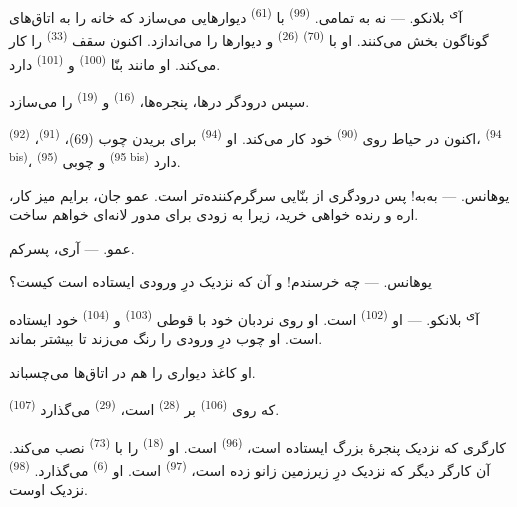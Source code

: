 آ\textsuperscript{ی} \textsc{بلانکو}. --- نه به تمامی. 
\textsuperscript{(99)} با  \textsuperscript{(61)}
دیوارهایی می‌سازد که خانه را به اتاق‌های گوناگون بخش می‌کنند. او با
 \textsuperscript{(70)} 
\textsuperscript{(26)} و دیوارها را می‌اندازد. اکنون سقف 
\textsuperscript{(33)} را کار می‌کند. او مانند بنّا 
\textsuperscript{(100)} و  \textsuperscript{(101)} دارد.

سپس درودگر درها، پنجره‌ها،  \textsuperscript{(16)} و
 \textsuperscript{(19)} را می‌سازد.

اکنون در حیاط روی  \textsuperscript{(90)} خود کار
می‌کند. او  \textsuperscript{(94)} برای بریدن چوب (69)،
 \textsuperscript{(91)}، 
\textsuperscript{(92)}،  \textsuperscript{(94 bis)}،
 \textsuperscript{(95)} و  چوبی
\textsuperscript{(95 bis)} دارد.

\textsc{یوهانس}. --- به‌به! پس درودگری از بنّایی سرگرم‌کننده‌تر است.
عمو جان، برایم میز کار، اره و رنده خواهی خرید، زیرا به زودی برای مدور
لانه‌ای خواهم ساخت.

\textsc{عمو}. --- آری، پسرکم.

\textsc{یوهانس}. --- چه خرسندم! و آن که نزدیک درِ ورودی ایستاده است
کیست؟

\VUsaut{3.0mm}
\VUsaut{3.0mm}

آ\textsuperscript{ی} \textsc{بلانکو}. --- او 
\textsuperscript{(102)} است. او روی نردبان خود با قوطی 
\textsuperscript{(103)} و  \textsuperscript{(104)} خود
ایستاده است. او چوب درِ ورودی را رنگ می‌زند تا بیشتر بماند.

او کاغذ دیواری را هم در اتاق‌ها می‌چسباند.

 \textsuperscript{(107)} که روی 
\textsuperscript{(106)} بر  \textsuperscript{(28)} است،
 \textsuperscript{(29)} می‌گذارد.

کارگری که نزدیک پنجرهٔ بزرگ ایستاده است، 
\textsuperscript{(96)} است. او 
\textsuperscript{(18)} را با  \textsuperscript{(73)} نصب
می‌کند. آن کارگر دیگر که نزدیک درِ زیرزمین زانو زده است،
 \textsuperscript{(97)} است. او 
\textsuperscript{(6)} می‌گذارد.  \textsuperscript{(98)}
نزدیک اوست.

